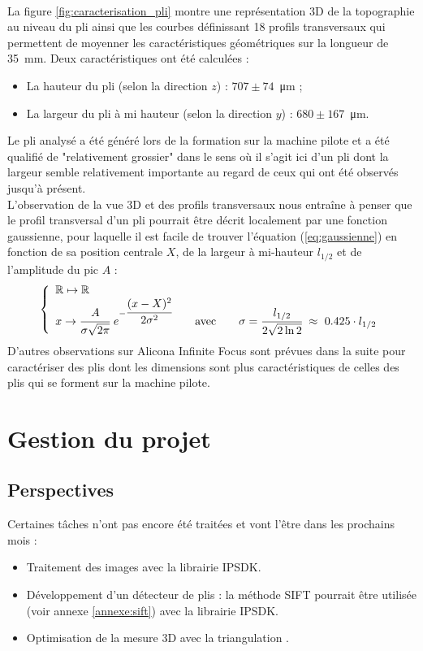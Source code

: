 \documentclass[a4paper, 11pt]{article}
\begin{document}
		\\La figure \ref{fig:caracterisation_pli} montre une représentation 3D de la topographie au niveau du pli ainsi que les courbes définissant \num{18} profils transversaux qui permettent de moyenner les caractéristiques géométriques sur la longueur de \SI{35}{\milli\meter}. Deux caractéristiques ont été calculées :
		\begin{itemize}[label=$\Rightarrow$]
			\item La hauteur du pli (selon la direction $z$) : $707 \pm 74$~\si{\micro\meter} ;
			\item La largeur du pli à mi hauteur (selon la direction $y$) : $680 \pm 167$~\si{\micro\meter}.
		\end{itemize}
		Le pli analysé a été généré lors de la formation sur la machine pilote et a été qualifié de "relativement grossier" dans le sens où il s'agit ici d'un pli dont la largeur semble relativement importante au regard de ceux qui ont été observés jusqu'à présent.
		\\L'observation de la vue 3D et des profils transversaux nous entraîne à penser que le profil transversal d'un pli pourrait être décrit localement par une fonction gaussienne, pour laquelle il est facile de trouver l'équation (\ref{eq:gaussienne}) en fonction de sa position centrale $X$, de la largeur à mi-hauteur $l_{1/2}$ et de l'amplitude du pic $A$ :
		\begin{equation}\label{eq:gaussienne}
		\left\{
		\begin{array}{l}
		\mathbb{R} \mapsto \mathbb{R} \\
		x \rightarrow \cfrac{A}{\sigma\sqrt{2\pi}}\ e^{-\cfrac{(x - X)^2}{2\sigma^2}} \qquad \text{avec}\qquad 
		\sigma = \cfrac{l_{1/2}}{2\sqrt{2\ln2}}\ \approx\ \num{0.425} \cdot l_{1/2}
		\end{array}\right.
		\end{equation}
		D'autres observations sur Alicona Infinite Focus sont prévues dans la suite pour caractériser des plis dont les dimensions sont plus caractéristiques de celles des plis qui se forment sur la machine pilote.


\section{Gestion du projet}
	\subsection*{Perspectives}
		Certaines tâches n'ont pas encore été traitées et vont l'être dans les prochains mois :
		\begin{itemize}[label=$\rightarrow$]
			\item Traitement des images avec la librairie IPSDK.
			\item Développement d'un détecteur de plis : la méthode SIFT pourrait être utilisée (voir annexe \ref{annexe:sift}) avec la librairie IPSDK.
			\item Optimisation de la mesure 3D avec la triangulation \cite{hartley_triangulation_1997}.
		\end{itemize}
	
\end{document}

